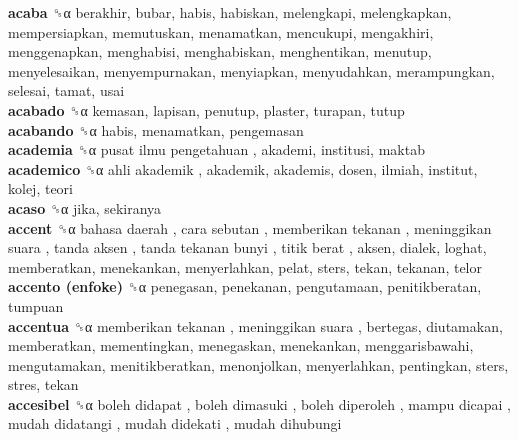 \textbf{acaba} ␝α  berakhir, bubar, habis, habiskan, melengkapi, melengkapkan, mempersiapkan, memutuskan, menamatkan, mencukupi, mengakhiri, menggenapkan, menghabisi, menghabiskan, menghentikan, menutup, menyelesaikan, menyempurnakan, menyiapkan, menyudahkan, merampungkan, selesai, tamat, usai  \\
\textbf{acabado} ␝α  kemasan, lapisan, penutup, plaster, turapan, tutup  \\
\textbf{acabando} ␝α  habis, menamatkan, pengemasan  \\
\textbf{academia} ␝α   pusat ilmu pengetahuan , akademi, institusi, maktab  \\
\textbf{academico} ␝α   ahli akademik , akademik, akademis, dosen, ilmiah, institut, kolej, teori  \\
\textbf{acaso} ␝α  jika, sekiranya  \\
\textbf{accent} ␝α   bahasa daerah ,  cara sebutan ,  memberikan tekanan ,  meninggikan suara ,  tanda aksen ,  tanda tekanan bunyi ,  titik berat , aksen, dialek, loghat, memberatkan, menekankan, menyerlahkan, pelat, sters, tekan, tekanan, telor  \\
\textbf{accento (enfoke)} ␝α  penegasan, penekanan, pengutamaan, penitikberatan, tumpuan  \\
\textbf{accentua} ␝α   memberikan tekanan ,  meninggikan suara , bertegas, diutamakan, memberatkan, mementingkan, menegaskan, menekankan, menggarisbawahi, mengutamakan, menitikberatkan, menonjolkan, menyerlahkan, pentingkan, sters, stres, tekan  \\
\textbf{accesibel} ␝α   boleh didapat ,  boleh dimasuki ,  boleh diperoleh ,  mampu dicapai ,  mudah didatangi ,  mudah didekati ,  mudah dihubungi   \\
